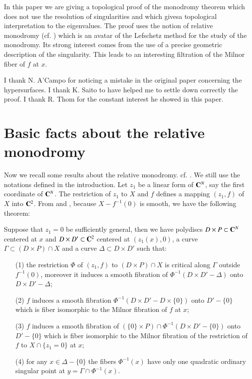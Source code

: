 In this paper we are giving a topological proof of the monodromy theorem which does not use the resolution of singularities and which gives\pageoriginale a topological interpretation to the eigenvalues. The proof uses the notion of relative monodromy (cf. \cite{art15-key6}) which is an avatar of the Lefschetz method for the study of the monodromy. Its strong interest comes from the use of a precise geometric description of the singularity. This leads to an interesting filtration of the Milnor fiber of $f$ at $x$.

I thank N. A'Campo for noticing a mistake in the original paper concerning the hypersurfaces. I thank K. Saito to have helped me to settle down correctly the proof. I thank R. Thom for the constant interest he showed in this paper.

\section{Basic facts about the relative monodromy}\label{art15-sec1}
Now we recall some results about the relative monodromy. cf. \cite{art15-key6}. We still use the notations defined in the introduction. Let $z_1$ be a linear form of $\mathbf{C}^N$, say the first coordinate of $\mathbf{C}^N$. The restriction of $z_1$ to $X$ and $f$ defines a mapping $(z_1, f)$ of $X$ into $\mathbf{C}^2$. From \cite{art15-key7} and \cite{art15-key6}, because $X-f^{-1}(0)$ is smooth, we have the following theorem:

\begin{thm}\label{art15-thm1.1}
Suppose that $z_1 =0$ be sufficiently general, then we have polydiscs $D \times P \subset \mathbf{C}^N$ centered at $x$ and $D \times D'\subset \mathbf{C}^2$ centered at $(z_1 (x), 0)$, a curve $\Gamma \subset (D \times P) \cap X$ and a curve $\Delta \subset D \times D'$  such that:
\begin{itemize}
\item[\rm (1)] the restriction $\Phi$ of $(z_1,f)$ to $(D \times P) \cap X$ is critical along $\Gamma$ outside $f^{-1} (0)$, moreover it induces a smooth fibration of $\Phi^{-1} (D \times D' - \Delta)$ onto $D \times D' - \Delta$;

\item[\rm (2)] $f$ induces a smooth fibration $\Phi^{-1} (D \times D' - D \times \{0\})$ onto $D' -\{0\}$ which is fiber isomorphic to the Milnor fibration of $f$  at $x$;

\item[\rm (3)] $f$ induces a smooth fibration of $(\{0\} \times P) \cap \Phi^{-1} (D \times D' - \{0\})$ onto $D'-\{0\}$ which is fiber isomorphic to the Milnor fibration of the restriction of $f$ to $X \cap \{z_1 = 0\}$ at $x$;

\item[\rm (4)]  for any $x \in \Delta - \{0\}$ the fibers $\Phi^{-1} (x)$ have only one quadratic ordinary singular point at $y = \Gamma \cap \Phi^{-1} (x)$.
\end{itemize}
\end{thm}

